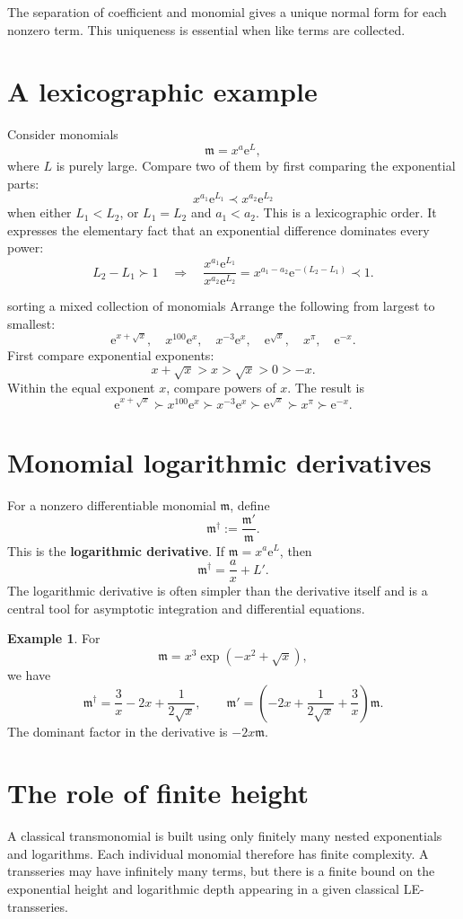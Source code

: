 \documentclass[11pt,openany]{book}
\theoremstyle{plain}
\theoremstyle{definition}
\newtheorem{example}[theorem]{Example}
\theoremstyle{remark}
\newcommand{\m}{\mathfrak{m}}
\newcommand{\e}{\mathrm{e}}
\newcommand{\defterm}[1]{\textbf{#1}}
\begin{document}
The separation of coefficient and monomial gives a unique normal form for each nonzero term. This uniqueness is essential when like terms are collected.

\section{A lexicographic example}
Consider monomials
\[
  \m=x^a\e^L,
\]
where $L$ is purely large. Compare two of them by first comparing the exponential parts:
\[
  x^{a_1}\e^{L_1}\prec x^{a_2}\e^{L_2}
\]
when either $L_1<L_2$, or $L_1=L_2$ and $a_1<a_2$. This is a lexicographic order. It expresses the elementary fact that an exponential difference dominates every power:
\[
  L_2-L_1\succ1
  \quad\Longrightarrow\quad
  \frac{x^{a_1}\e^{L_1}}{x^{a_2}\e^{L_2}}
  =x^{a_1-a_2}\e^{-(L_2-L_1)}\prec1.
\]

\begin{workedbox}{sorting a mixed collection of monomials}
Arrange the following from largest to smallest:
\[
  \e^{x+\sqrt{x}},\quad x^{100}\e^x,\quad x^{-3}\e^x,
  \quad \e^{\sqrt{x}},\quad x^\pi,\quad \e^{-x}.
\]
First compare exponential exponents:
\[
  x+\sqrt{x}>x>\sqrt{x}>0>-x.
\]
Within the equal exponent $x$, compare powers of $x$. The result is
\[
  \e^{x+\sqrt{x}}
  \succ x^{100}\e^x
  \succ x^{-3}\e^x
  \succ \e^{\sqrt{x}}
  \succ x^\pi
  \succ \e^{-x}.
\]
\end{workedbox}

\section{Monomial logarithmic derivatives}
For a nonzero differentiable monomial $\m$, define
\[
  \m^\dagger:=\frac{\m'}{\m}.
\]
This is the \defterm{logarithmic derivative}. If $\m=x^a\e^L$, then
\[
  \m^\dagger=\frac{a}{x}+L'.
\]
The logarithmic derivative is often simpler than the derivative itself and is a central tool for asymptotic integration and differential equations.

\begin{example}
For
\[
  \m=x^3\exp\!\left(-x^2+\sqrt{x}\right),
\]
we have
\[
  \m^\dagger=\frac3x-2x+\frac{1}{2\sqrt{x}},
  \qquad
  \m'=\left(-2x+\frac{1}{2\sqrt{x}}+\frac3x\right)\m.
\]
The dominant factor in the derivative is $-2x\m$.
\end{example}

\section{The role of finite height}
A classical transmonomial is built using only finitely many nested exponentials and logarithms. Each individual monomial therefore has finite complexity. A transseries may have infinitely many terms, but there is a finite bound on the exponential height and logarithmic depth appearing in a given classical LE-transseries.
\end{document}
